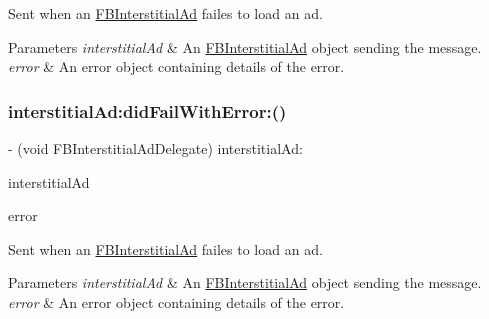 Sent when an \hyperlink{interfaceFBInterstitialAd}{F\+B\+Interstitial\+Ad} failes to load an ad.


\begin{DoxyParams}{Parameters}
{\em interstitial\+Ad} & An \hyperlink{interfaceFBInterstitialAd}{F\+B\+Interstitial\+Ad} object sending the message. \\
\hline
{\em error} & An error object containing details of the error. \\
\hline
\end{DoxyParams}
\mbox{\label{protocolFBInterstitialAdDelegate_01-p_a55d38d3ba346d2251fe10cec24023da7}} 
\subsubsection{\texorpdfstring{interstitial\+Ad\+:did\+Fail\+With\+Error\+:()}{interstitialAd:didFailWithError:()}\hspace{0.1cm}{\footnotesize\ttfamily [3/5]}}
{\footnotesize\ttfamily -\/ (void F\+B\+Interstitial\+Ad\+Delegate) interstitial\+Ad\+: \begin{DoxyParamCaption}\item[{(\hyperlink{interfaceFBInterstitialAd}{F\+B\+Interstitial\+Ad} $\ast$)}]{interstitial\+Ad }\item[{didFailWithError:(N\+S\+Error $\ast$)}]{error }\end{DoxyParamCaption}\hspace{0.3cm}{\ttfamily [optional]}}

Sent when an \hyperlink{interfaceFBInterstitialAd}{F\+B\+Interstitial\+Ad} failes to load an ad.


\begin{DoxyParams}{Parameters}
{\em interstitial\+Ad} & An \hyperlink{interfaceFBInterstitialAd}{F\+B\+Interstitial\+Ad} object sending the message. \\
\hline
{\em error} & An error object containing details of the error. \\
\hline
\end{DoxyParams}
\mbox{\label{protocolFBInterstitialAdDelegate_01-p_a55d38d3ba346d2251fe10cec24023da7}} 
